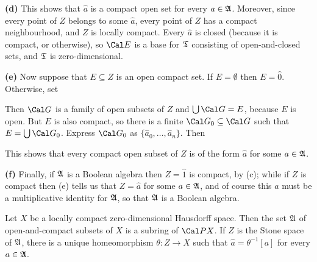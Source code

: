 {\medskip 
 
{\bf (d)} This shows that $\widehat{a}$ is a compact open set for every 
$a\in\frak A$.   Moreover, since every point of $Z$ belongs to some 
$\widehat{a}$, every point of $Z$ has a compact neighbourhood, and $Z$ 
is locally compact. 
Every $\widehat{a}$ is closed (because it is compact, or otherwise), so 
$\Cal E$ is a base for $\frak T$ consisting of open-and-closed sets, and 
$\frak T$ is zero-dimensional. 
 
\medskip 
 
{\bf (e)} Now suppose that $E\subseteq Z$ is an open compact set.   If 
$E=\emptyset$ then $E=\widehat{0}$.   Otherwise, set 
 
 
\noindent Then $\Cal G$ is a family of open subsets of $Z$ and 
$\bigcup\Cal G=E$, because $E$ is open.   But $E$ is also compact, so 
there is a finite $\Cal G_0\subseteq\Cal G$ such that 
$E=\bigcup\Cal G_0$.   Express $\Cal G_0$ as 
$\{\widehat{a}_0,\ldots,\widehat{a}_n\}$.   Then 
 
 
\noindent This shows that every compact open subset of $Z$ is of the 
form $\widehat{a}$ for some $a\in\frak A$. 
 
\medskip 
 
{\bf (f)} Finally, if $\frak A$ is a Boolean algebra then 
$Z=\widehat{1}$ is compact, by (c);  while if $Z$ is compact then (e) 
tells us that $Z=\widehat{a}$ for some $a\in\frak A$, and of course 
this $a$ must be a multiplicative identity for $\frak A$, so that 
$\frak A$ is a Boolean algebra. 
}%
 
 Let $X$ be a locally compact 
zero-dimensional Hausdorff space.   Then the set $\frak A$ of 
open-and-compact subsets of $X$ is a subring of $\Cal PX$.   If $Z$ is 
the Stone space of $\frak A$, there is a unique homeomorphism 
$\theta:Z\to X$ such that $\widehat{a}=\theta^{-1}[a]$ for every 
$a\in\frak A$. 
 
